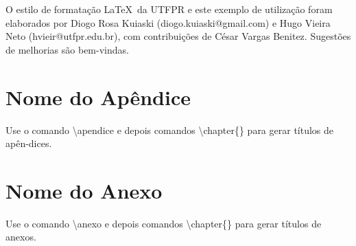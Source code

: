 \documentclass[openright]{normas-utf-tex} %
\begin{document}
O estilo de formata\c{c}\~ao \LaTeX\ da UTFPR e este exemplo de utiliza\c{c}\~ao foram elaborados por Diogo Rosa Kuiaski (diogo.kuiaski@gmail.com) e Hugo Vieira Neto (hvieir@utfpr.edu.br), com contribui\c{c}\~oes de C\'esar Vargas Benitez. Sugest\~oes de melhorias s\~ao bem-vindas.


\clearpage %
\label{bibstart}
\label{bibend}

\apendice
\chapter{Nome do Ap\^endice}

Use o comando {\ttfamily \textbackslash apendice} e depois comandos {\ttfamily \textbackslash chapter\{\}}
para gerar t\'itulos de ap\^en-dices.


\anexo
\chapter{Nome do Anexo}

Use o comando {\ttfamily \textbackslash anexo} e depois comandos {\ttfamily \textbackslash chapter\{\}}
para gerar t\'itulos de anexos.


%
%
%
%
\end{document}
